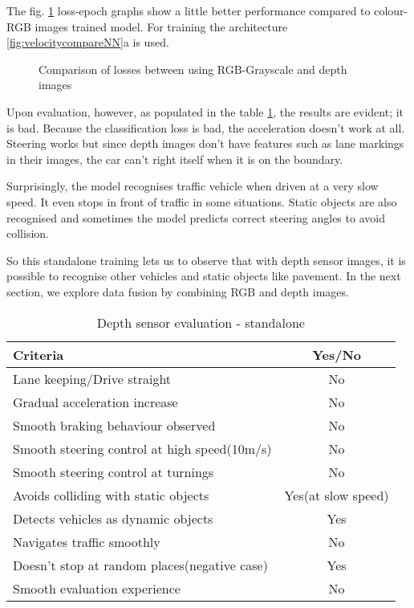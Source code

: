 The fig. \ref{fig:colourvsdepth1} loss-epoch graphs show a little better performance compared to
colour-RGB images trained model. For training the architecture
\ref{fig:velocitycompareNN}a is used.
\begin{figure}[!ht]
    \centering
    \def\svgwidth{\textwidth}
    \caption{Comparison of losses between using RGB-Grayscale and depth images}
    \label{fig:colourvsdepth1}
\end{figure}
Upon evaluation, however, as populated in the table \ref{table:depthsensorstandalone},
the results are evident; it is bad. Because the classification loss is bad, the
acceleration doesn't work at all. Steering works but since depth images don't have
features such as lane markings in their images, the car can't right itself when it is on
the boundary.

Surprisingly, the model recognises traffic vehicle when driven at a very slow speed. It
even stops in front of traffic in some situations. Static objects are also recognised and
sometimes the model predicts correct steering angles to avoid collision.

So this standalone training lets us to observe that with depth sensor images, it is
possible to recognise other vehicles and static objects like pavement. In the next
section, we explore data fusion by combining RGB and depth images.
\begin{table}[!ht]
    \centering
\begin{tabular}{lc}
    \toprule
    Criteria  & Yes/No \\\midrule
    Lane keeping/Drive straight  & No  \\
    Gradual acceleration increase  & No\\
    Smooth braking behaviour observed & No \\
    Smooth steering control at high speed(10m/s) & No \\
    Smooth steering control at turnings & No\\
    Avoids colliding with static objects & Yes(at slow speed) \\
    Detects vehicles as dynamic objects & Yes \\
    Navigates traffic smoothly & No\\
    Doesn't stop at random places(negative case) & Yes \\
    Smooth evaluation experience & No \\\bottomrule
\end{tabular}
\caption{Depth sensor evaluation - standalone}
\label{table:depthsensorstandalone}
\end{table}

